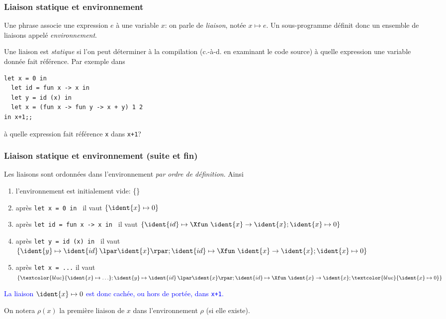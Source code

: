 %
\begin{frame}[containsverbatim]
\frametitle{Liaison statique et environnement}
\label{exemple_liaisons}

Une phrase associe une expression $e$ à une variable $x$: on parle de
\emph{liaison}, notée $x \mapsto e$. Un sous-programme définit donc un
ensemble de liaisons appelé \emph{environnement}. 

\bigskip

Une liaison est \emph{statique} si l'on peut déterminer à la
compilation (c.-à-d. en examinant le code source) à quelle expression
une variable donnée fait référence. Par exemple dans {\small
\begin{verbatim}
let x = 0 in
  let id = fun x -> x in
  let y = id (x) in
  let x = (fun x -> fun y -> x + y) 1 2 
in x+1;;
\end{verbatim}
}
à quelle expression fait référence \verb+x+ dans \verb|x+1|?

\end{frame}

%
\begin{frame}[containsverbatim]
\frametitle{Liaison statique et environnement (suite et fin)}

Les liaisons sont ordonnées dans l'environnement \emph{par ordre de
définition}. Ainsi
\begin{enumerate}

  \item l'environnement est initialement vide: \{\}

  \item après {\small \verb|let x = 0 in |} il vaut $\{\ident{x} \mapsto
  0\}$

  \item après {\small \verb|let id = fun x -> x in |} il vaut
  $\{\ident{id} \mapsto \Xfun \,\, \ident{x} \rightarrow \ident{x}; \ident{x}
  \mapsto 0\}$

  \item après {\small \verb|let y = id (x) in |} il vaut $\{\ident{y}
  \mapsto \ident{id} \, \lpar\ident{x}\rpar; \ident{id} \mapsto \Xfun \,\,
  \ident{x} \rightarrow \ident{x}; \ident{x} \mapsto 0\}$

  \item après {\small \verb|let x = ...|} il vaut $\{\textcolor{blue}{\ident{x}
  \mapsto \ldots}; \ident{y} \mapsto \ident{id} \, \lpar\ident{x}\rpar; \ident{id}
  \mapsto \Xfun \,\, \ident{x} \rightarrow \ident{x}; \textcolor{blue}{\ident{x} \mapsto
  0}\}$

\end{enumerate}

\textcolor{blue}{La liaison $\ident{x} \mapsto 0$ est donc cachée, ou hors de
portée, dans \texttt{x+1}.}

\bigskip

On notera $\rho(x)$ la première liaison de $x$ dans l'environnement
$\rho$ (si elle existe).

\end{frame}

